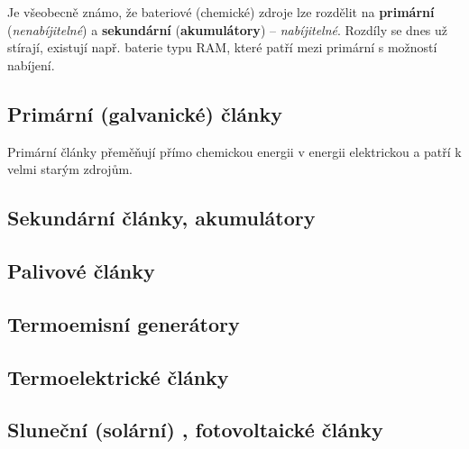     Je všeobecně známo, že bateriové (chemické) zdroje lze rozdělit na \textbf{primární} 
    (\emph{nenabíjitelné}) a \textbf{sekundární} (\textbf{a\-ku\-mu\-lá\-to\-ry}) – 
    \emph{nabíjitelné}. Rozdíly se dnes už stírají, existují např. baterie typu RAM,  které patří 
    mezi primární s možností nabíjení.
    
    \subsection{Primární (galvanické) články}
      Primární články přeměňují přímo chemickou energii v energii elektrickou a patří k velmi 
      starým zdrojům.
    \subsection{Sekundární články, akumulátory}
    \subsection{Palivové články}
    \subsection{Termoemisní generátory}
    \subsection{Termoelektrické články}
    \subsection{Sluneční (solární) , fotovoltaické články}
    
